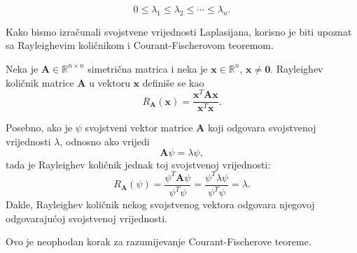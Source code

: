 \begin{equation}\label{laplasijan:eigenvrijednosti-poredane}
0\leq\lambda_1\leq\lambda_2\leq\cdots\leq\lambda_n.
\end{equation}

Kako bismo izračunali svojstvene vrijednosti Laplasijana, korisno je biti upoznat sa Rayleighevim količnikom i Courant-Fischerovom teoremom.

\begin{definition}\label{def:rayleighov-kolicnik}
      Neka je \(\mathbf{A}\in\mathbb{R}^{n\times n}\) simetrična matrica i neka je
      \(\mathbf{x}\in\mathbb{R}^n\), \(\mathbf{x}\neq \mathbf{0}\). Rayleighev količnik
      matrice \(\mathbf{A}\) u vektoru \(\mathbf{x}\) definiše se kao
      \begin{equation}
          R_{\mathbf{A}}(\mathbf{x})
          =
          \frac{\mathbf{x}^T\mathbf{A}\mathbf{x}}{\mathbf{x}^T\mathbf{x}}.
      \end{equation}

      Posebno, ako je \(\psi\) svojstveni vektor matrice
       \(\mathbf{A}\) koji odgovara svojstvenoj vrijednosti \(\lambda\), odnosno ako
       vrijedi
       \begin{equation}
          \mathbf{A}\psi=\lambda\psi,
       \end{equation}
       tada je Rayleighev količnik jednak toj svojstvenoj vrijednosti:
       \begin{equation}
          R_{\mathbf{A}}(\psi)
           =
          \frac{\psi^T\mathbf{A}\psi}
          {\psi^T\psi}
           =
          \frac{\psi^T\lambda\psi}
          {\psi^T\psi}
           =
          \lambda.
       \end{equation}
      Dakle, Rayleighev količnik nekog svojstvenog vektora odgovara njegovoj odgovarajućoj svojstvenoj vrijednosti. \cite{chung1997spectral}
   \end{definition}

Ovo je neophodan korak za razumijevanje Courant-Fischerove teoreme.


